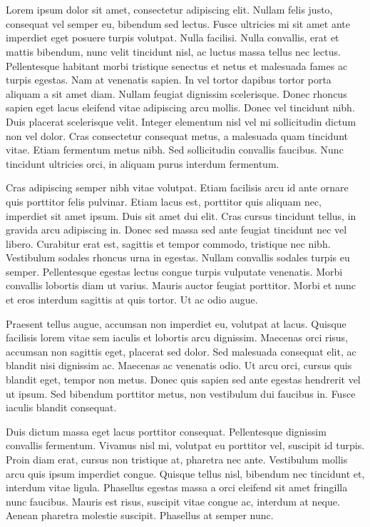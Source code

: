 \chapter{}
Lorem ipsum dolor sit amet, consectetur adipiscing elit. Nullam felis justo, consequat vel semper eu, bibendum sed lectus. Fusce ultricies mi sit amet ante imperdiet eget posuere turpis volutpat. Nulla facilisi. Nulla convallis, erat et mattis bibendum, nunc velit tincidunt nisl, ac luctus massa tellus nec lectus. Pellentesque habitant morbi tristique senectus et netus et malesuada fames ac turpis egestas. Nam at venenatis sapien. In vel tortor dapibus tortor porta aliquam a sit amet diam. Nullam feugiat dignissim scelerisque. Donec rhoncus sapien eget lacus eleifend vitae adipiscing arcu mollis. Donec vel tincidunt nibh. Duis placerat scelerisque velit. Integer elementum nisl vel mi sollicitudin dictum non vel dolor. Cras consectetur consequat metus, a malesuada quam tincidunt vitae. Etiam fermentum metus nibh. Sed sollicitudin convallis faucibus. Nunc tincidunt ultricies orci, in aliquam purus interdum fermentum. \cite{pennes}

Cras adipiscing semper nibh vitae volutpat. Etiam facilisis arcu id ante ornare quis porttitor felis pulvinar. Etiam lacus est, porttitor quis aliquam nec, imperdiet sit amet ipsum. Duis sit amet dui elit. Cras cursus tincidunt tellus, in gravida arcu adipiscing in. Donec sed massa sed ante feugiat tincidunt nec vel libero. Curabitur erat est, sagittis et tempor commodo, tristique nec nibh. Vestibulum sodales rhoncus urna in egestas. Nullam convallis sodales turpis eu semper. Pellentesque egestas lectus congue turpis vulputate venenatis. Morbi convallis lobortis diam ut varius. Mauris auctor feugiat porttitor. Morbi et nunc et eros interdum sagittis at quis tortor. Ut ac odio augue.

Praesent tellus augue, accumsan non imperdiet eu, volutpat at lacus. Quisque facilisis lorem vitae sem iaculis et lobortis arcu dignissim. Maecenas orci risus, accumsan non sagittis eget, placerat sed dolor. Sed malesuada consequat elit, ac blandit nisi dignissim ac. Maecenas ac venenatis odio. Ut arcu orci, cursus quis blandit eget, tempor non metus. Donec quis sapien sed ante egestas hendrerit vel ut ipsum. Sed bibendum porttitor metus, non vestibulum dui faucibus in. Fusce iaculis blandit consequat.

Duis dictum massa eget lacus porttitor consequat. Pellentesque dignissim convallis fermentum. Vivamus nisl mi, volutpat eu porttitor vel, suscipit id turpis. Proin diam erat, cursus non tristique at, pharetra nec ante. Vestibulum mollis arcu quis ipsum imperdiet congue. Quisque tellus nisl, bibendum nec tincidunt et, interdum vitae ligula. Phasellus egestas massa a orci eleifend sit amet fringilla nunc faucibus. Mauris est risus, suscipit vitae congue ac, interdum at neque. Aenean pharetra molestie suscipit. Phasellus at semper nunc.

